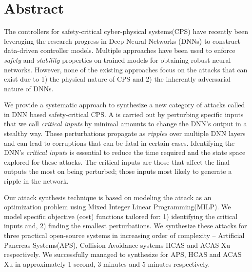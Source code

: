 
\chapter{Abstract}

The controllers for safety-critical cyber-physical systems(CPS) have recently been leveraging the research progress in Deep Neural Networks (DNNs) to construct data-driven controller models. Multiple approaches have been used to enforce \textit{safety} and \textit{stability} properties on trained models for obtaining robust neural networks. However, none of the existing approaches focus on the attacks that can exist due to 1) the physical nature of CPS and 2) the inherently adversarial nature of DNNs.  

We provide a systematic approach to synthesize a new category of attacks called \attack in DNN based safety-critical CPS. A \attack is carried out by perturbing specific inputs that we call \textit{critical inputs} by minimal amounts to change the DNN's output in a stealthy way. These perturbations propagate as \textit{ripples} over multiple DNN layers and can lead to corruptions that can be fatal in certain cases. Identifying the DNN's \textit{critical inputs} is essential to reduce the time required and the state space explored for these attacks. The critical inputs are those that affect the final outputs the most on being perturbed; those inputs most likely to generate a ripple in the network. 

Our attack synthesis technique is based on modeling the attack as an optimization problem using Mixed Integer Linear Programming(MILP). We model \attack specific objective (cost) functions tailored for: 1) identifying the critical inputs and, 2) finding the smallest perturbations. We synthesize these attacks for three practical open-source systems in increasing order of complexity -- Artificial Pancreas Systems(APS), Collision Avoidance systems HCAS and ACAS Xu respectively. We successfully managed to synthesize  \attack for APS, HCAS and ACAS Xu in approximately 1 second, 3 minutes and 5 minutes respectively. 

